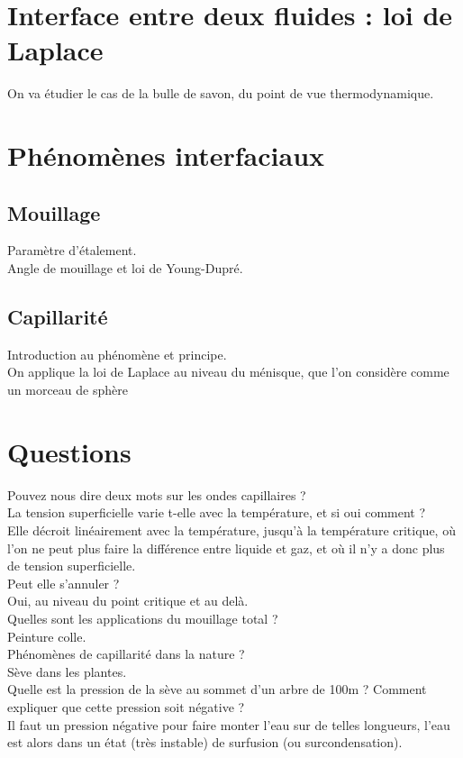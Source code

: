 \documentclass[12pt,prb,aps,epsf]{report}
\begin{document}
\section{Interface entre deux fluides : loi de Laplace}
On va étudier le cas de la bulle de savon, du point de vue thermodynamique.
\section{Phénomènes interfaciaux}
\subsection{Mouillage}
Paramètre d'étalement.\\
Angle de mouillage et loi de Young-Dupré.
\subsection{Capillarité}
Introduction au phénomène et principe.\\
On applique la loi de Laplace au niveau du ménisque, que l'on considère comme un morceau de sphère

\section*{Questions}
Pouvez nous dire deux mots sur les ondes capillaires ?\\

La tension superficielle varie t-elle avec la température, et si oui comment ?\\
Elle décroit linéairement avec la température, jusqu'à la température critique, où l'on ne peut plus faire la différence entre liquide et gaz, et où il n'y a donc plus de tension superficielle.\\

Peut elle s'annuler ?\\
Oui, au niveau du point critique et au delà.\\

Quelles sont les applications du mouillage total ?\\
Peinture colle.\\

Phénomènes de capillarité dans la nature ?\\
Sève dans les plantes.\\

Quelle est la pression de la sève au sommet d'un arbre de 100m ? Comment expliquer que cette pression soit négative ?\\
Il faut un pression négative pour faire monter l'eau sur de telles longueurs, l'eau est alors dans un état (très instable) de surfusion (ou surcondensation).
\end{document}
